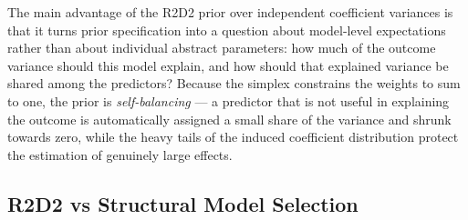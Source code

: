 \documentclass[
  letterpaper,
  DIV=11,
  numbers=noendperiod]{scrartcl}
\begin{document}
\begin{tcolorbox}[enhanced jigsaw, titlerule=0mm, arc=.35mm, leftrule=.75mm, colback=white, bottomtitle=1mm, toptitle=1mm, colbacktitle=quarto-callout-note-color!10!white, colframe=quarto-callout-note-color-frame, opacitybacktitle=0.6, bottomrule=.15mm, opacityback=0, toprule=.15mm, left=2mm, title=\textcolor{quarto-callout-note-color}{\faInfo}\hspace{0.5em}{Note}, rightrule=.15mm, breakable, coltitle=black]

The main advantage of the R2D2 prior over independent coefficient
variances is that it turns prior specification into a question about
model-level expectations rather than about individual abstract
parameters: how much of the outcome variance should this model explain,
and how should that explained variance be shared among the predictors?
Because the simplex constrains the weights to sum to one, the prior is
\emph{self-balancing} --- a predictor that is not useful in explaining
the outcome is automatically assigned a small share of the variance and
shrunk towards zero, while the heavy tails of the induced coefficient
distribution protect the estimation of genuinely large effects.

\end{tcolorbox}

\subsection{R2D2 vs Structural Model
Selection}\label{r2d2-vs-structural-model-selection}
\end{document}
